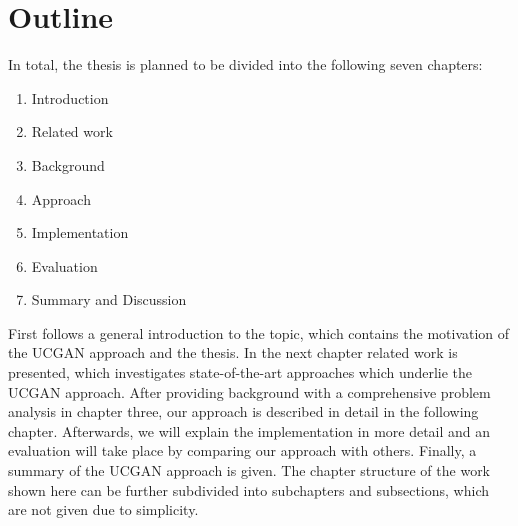 \chapter{Outline}
\label{ch:outline}

In total, the thesis is planned to be divided into the following seven chapters:
\begin{enumerate}
    \item Introduction
    \item Related work
    \item Background
    \item Approach
    \item Implementation
    \item Evaluation
    \item Summary and Discussion
\end{enumerate}
First follows a general introduction to the topic, which contains the motivation of the \ac{UCGAN} approach and the thesis.
In the next chapter related work is presented, which investigates state-of-the-art approaches which underlie the \ac{UCGAN} approach.
After providing background with a comprehensive problem analysis in chapter three, our approach is described in detail in the following chapter.
Afterwards, we will explain the implementation in more detail and an evaluation will take place by comparing our approach with others.
Finally, a summary of the \ac{UCGAN} approach is given.
The chapter structure of the work shown here can be further subdivided into subchapters and subsections, which are not given due to simplicity.